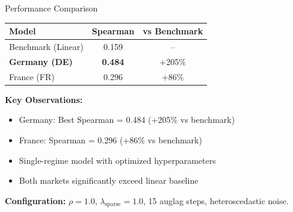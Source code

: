 \documentclass[aspectratio=169]{beamer}
\begin{document}
\begin{frame}{Performance Comparison}
\begin{table}
\centering
\begin{tabular}{l|c|c}
\toprule
\textbf{Model} & \textbf{Spearman} & \textbf{vs Benchmark} \\
\midrule
\rowcolor{lightgray} Benchmark (Linear) & 0.159 & -- \\
\midrule
\textbf{Germany (DE)} & \textcolor{reprogreen}{\textbf{0.484}} & \textcolor{reprogreen}{+205\%} \\
France (FR) & \textcolor{reprogreen}{0.296} & \textcolor{reprogreen}{+86\%} \\
\bottomrule
\end{tabular}
\end{table}

\vspace{0.3cm}
\textbf{Key Observations:}
\begin{itemize}
    \item \textcolor{reprogreen}{Germany: Best Spearman = 0.484 (+205\% vs benchmark)}
    \item \textcolor{reprogreen}{France: Spearman = 0.296 (+86\% vs benchmark)}
    \item Single-regime model with optimized hyperparameters
    \item Both markets significantly exceed linear baseline
\end{itemize}

\vspace{0.2cm}
\textbf{Configuration:} $\rho=1.0$, $\lambda_{\text{sparse}}=1.0$, 15 auglag steps, heteroscedastic noise.
\end{frame}
\end{document}
